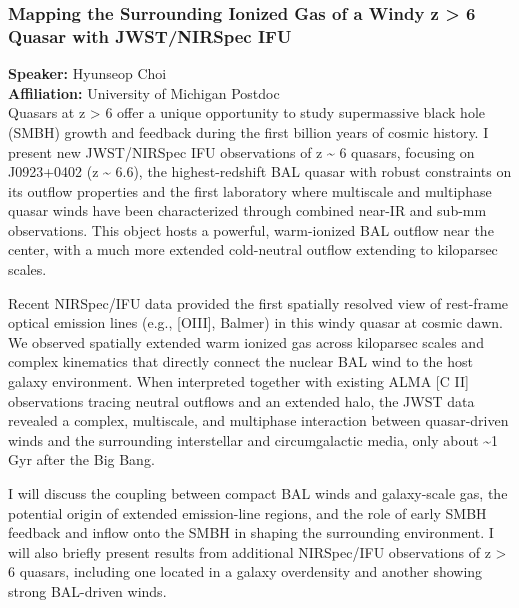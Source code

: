 \subsubsection*{Mapping the Surrounding Ionized Gas of a Windy z > 6 Quasar with JWST/NIRSpec IFU}
\textbf{Speaker:} Hyunseop Choi \\
\textbf{Affiliation:} University of Michigan \textperiodcentered{} Postdoc\\
Quasars at z > 6 offer a unique opportunity to study supermassive black hole (SMBH) growth and feedback during the first billion years of cosmic history. I present new JWST/NIRSpec IFU observations of z \textasciitilde{} 6 quasars, focusing on J0923+0402 (z \textasciitilde{} 6.6), the highest-redshift BAL quasar with robust constraints on its outflow properties and the first laboratory where multiscale and multiphase quasar winds have been characterized through combined near-IR and sub-mm observations. This object hosts a powerful, warm-ionized BAL outflow near the center, with a much more extended cold-neutral outflow extending to kiloparsec scales.

Recent NIRSpec/IFU data provided the first spatially resolved view of rest-frame optical emission lines (e.g., [OIII], Balmer) in this windy quasar at cosmic dawn. We observed spatially extended warm ionized gas across kiloparsec scales and complex kinematics that directly connect the nuclear BAL wind to the host galaxy environment. When interpreted together with existing ALMA [C II] observations tracing neutral outflows and an extended halo, the JWST data revealed a complex, multiscale, and multiphase interaction between quasar-driven winds and the surrounding interstellar and circumgalactic media, only about \textasciitilde{}1 Gyr after the Big Bang.

I will discuss the coupling between compact BAL winds and galaxy-scale gas, the potential origin of extended emission-line regions, and the role of early SMBH feedback and inflow onto the SMBH in shaping the surrounding environment. I will also briefly present results from additional NIRSpec/IFU observations of z > 6 quasars, including one located in a galaxy overdensity and another showing strong BAL-driven winds.

\hypertarget{abs-32}{}
